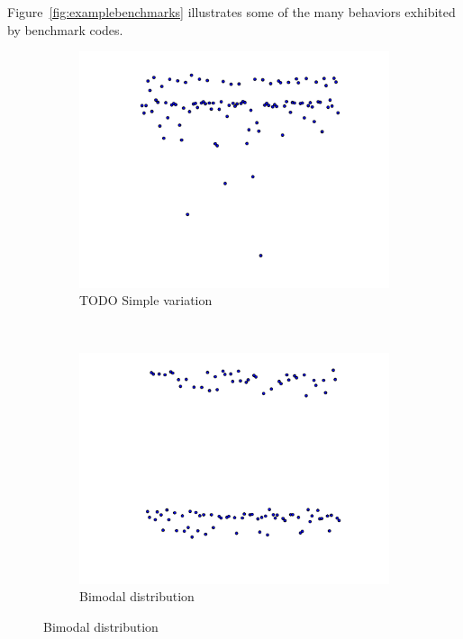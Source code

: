 \documentclass[conference]{IEEEtran}
\begin{document}
Figure~\ref{fig:examplebenchmarks} illustrates some of the many behaviors exhibited by benchmark codes.

\begin{figure}
\centering

\begin{subfigure}{0.22\textwidth}
    \centering
    \includegraphics[width=\textwidth]{figures/fig1/simple_branchsum_fast}
    \caption{TODO Simple variation}
\end{subfigure}%
~
\begin{subfigure}{0.22\textwidth}
    \centering
    \includegraphics[width=\textwidth]{figures/fig1/bimodal_branchsum}
    \caption{Bimodal distribution}
\end{subfigure}


\end{figure}
\end{document}
